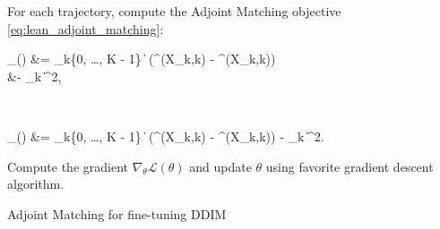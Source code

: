 \begin{algorithm}[h]
{{    For each trajectory, compute the Adjoint Matching objective \eqref{eq:lean_adjoint_matching}: 
    \begin{talign} \begin{split} \label{eq:adj_matching_algorithm_box_DDIM}
    _{}(\theta) &=
        \sum_{k\in\{0, \dots, K - 1\}} \big\|
        (\epsilon^{}(X_k,k) - \epsilon^{}(X_k,k))
        \\ &\qquad\qquad\qquad\qquad - 
        _k \big\|^2,
    \end{split} \\
    \begin{split} \label{eq:adj_matching_algorithm_box_DDIM_2}
     _{}(\theta) &=
        \sum_{k\in\{0, \dots, K - 1\}} \big\|
         (\epsilon^{}(X_k,k) - \epsilon^{}(X_k,k))
        -  _k \big\|^2.
    \end{split}
    \end{talign}
    
    Compute the gradient $\nabla_{\theta} \mathcal{L}(\theta)$ and update $\theta$ using favorite gradient descent algorithm.
  }
}
\caption{Adjoint Matching for fine-tuning DDIM}
\label{alg:adjoint_matching_finetuning_DDIM}
\end{algorithm}

